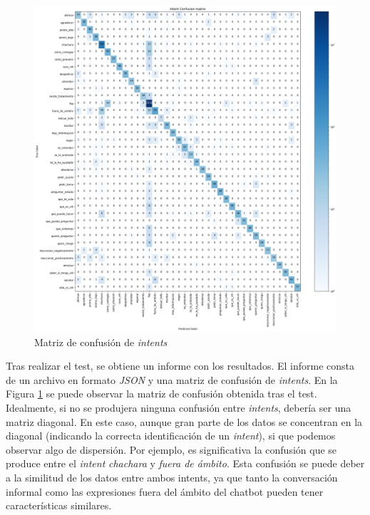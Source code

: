 \begin{figure}[htbp]
\centering
\includegraphics[scale=0.4]{../images/intent_confusion_matrix.png}
\caption{Matriz de confusión de \textit{intents}}
\label{fig:intentconfusion}
\end{figure}
Tras realizar el test, se obtiene un informe con los resultados. El informe consta de un archivo en formato \textit{JSON} y una matriz de confusión de \textit{intents}. En la Figura \ref{fig:intentconfusion} se puede observar la matriz de confusión obtenida tras el test. Idealmente, si no se produjera ninguna confusión entre \textit{intents}, debería ser una matriz diagonal. En este caso, aunque gran parte de los datos se concentran en la diagonal (indicando la correcta identificación de un \textit{intent}), si que podemos observar algo de dispersión. Por ejemplo, es significativa la confusión que se produce entre el \textit{intent} \textit{chachara} y \textit{fuera de ámbito}. Esta confusión se puede deber a la similitud de los datos entre ambos intents, ya que tanto la conversación informal como las expresiones fuera del ámbito del chatbot pueden tener características similares.\\

 


